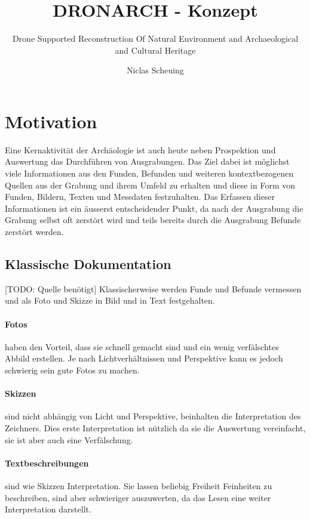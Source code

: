 \documentclass{paper}
\begin{document}
	\title{DRONARCH - Konzept}
	\subtitle{Drone Supported Reconstruction Of Natural Environment and Archaeological and Cultural Heritage}
	
	\author{Niclas Scheuing}
	
	\maketitle
	\tableofcontents
	
	
	\section{Motivation}
		Eine Kernaktivität der Archäologie ist auch heute neben Prospektion und Auswertung das Durchführen von Ausgrabungen.
		Das Ziel dabei ist möglichst viele Informationen aus den Funden, Befunden und weiteren kontextbezogenen Quellen aus der Grabung und ihrem Umfeld zu erhalten und diese in Form von Funden, Bildern, Texten und Messdaten festzuhalten.
		Das Erfassen dieser Informationen ist ein äusserst entscheidender Punkt, da nach der Ausgrabung die Grabung selbst oft zerstört wird und teils bereits durch die Ausgrabung Befunde zerstört werden.
		
		\subsection{Klassische Dokumentation}
			[TODO: Quelle benötigt]
			Klassischerweise werden Funde und Befunde vermessen und als Foto und Skizze in Bild und in Text festgehalten.

			\paragraph{Fotos} haben den Vorteil, dass sie schnell gemacht sind und ein wenig verfälschtes Abbild erstellen. Je nach Lichtverhältnissen und Perspektive kann es jedoch schwierig sein gute Fotos zu machen.
			
			\paragraph{Skizzen} sind nicht abhängig von Licht und Perspektive, beinhalten die Interpretation des Zeichners. Dies erste Interpretation ist nützlich da sie die Auswertung vereinfacht, sie ist aber auch eine Verfälschung.
			
			\paragraph{Textbeschreibungen} sind wie Skizzen Interpretation. Sie lassen beliebig Freiheit Feinheiten zu beschreiben, sind aber schwieriger auszuwerten, da das Lesen eine weiter Interpretation darstellt.
			
\end{document}
